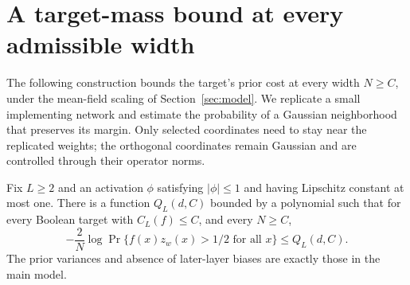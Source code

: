 \section{A target-mass bound at every admissible width}\label{sec:cloning}
The following construction bounds the target's prior cost at every width $N\geq C$,
under the mean-field scaling of Section~\ref{sec:model}. We replicate a
small implementing network and estimate the probability of a Gaussian
neighborhood that preserves its margin. Only selected coordinates need
to stay near the replicated weights; the orthogonal coordinates remain
Gaussian and are controlled through their operator norms.

\begin{proposition}\label{prop:cloning}
Fix $L\geq2$ and an activation $\phi$ satisfying $|\phi|\leq1$ and having Lipschitz constant at most one. There is a function $Q_L(d,C)$ bounded by a polynomial such that for every Boolean target with
$C_L(f)\leq C$, and every $N\geq C$,
\[
 -\frac{2}{N}\log\Pr\{f(x)z_w(x)>1/2\text{ for all }x\}
 \leq Q_L(d,C).
\]
The prior variances and absence of later-layer biases are exactly those in the
main model.
\end{proposition}
